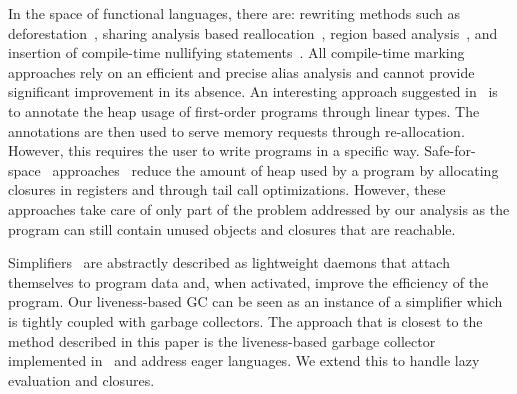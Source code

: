 \documentclass[9pt]{sigplanconf}
\begin{document}
In the  space of  functional languages,  there are:  rewriting methods
such                                                                as
deforestation~\cite{wadler88deforest,gill93ashort,chitil99deforest},
sharing  analysis   based  reallocation~\cite{jones89compile},  region
based  analysis~\cite{tofte98region},  and insertion  of  compile-time
nullifying     statements~\cite{inoue88analysis,lee05static,Hamilton}.
All compile-time marking  approaches rely on an  efficient and precise
alias  analysis  and cannot  provide  significant  improvement in  its
absence.  An interesting approach suggested in~\cite{HofmannJ03} is to
annotate the heap usage of  first-order programs through linear types.
The  annotations  are  then  used to  serve  memory  requests  through
re-allocation.  However, this requires the user to write programs in a
specific way. 
%
Safe-for-space~\cite{appel.cps}              approaches~\cite{Clinger,
  shao00efficient}  reduce the  amount of  heap used  by a  program by
allocating   closures    in   registers   and   through    tail   call
optimizations. However, these approaches take care of only part of the
problem addressed  by our  analysis as the  program can  still contain
unused objects and closures that are reachable.
%

Simplifiers~\cite{ONeill}  are  abstractly  described  as  lightweight
daemons that  attach themselves to  program data and,  when activated,
improve the  efficiency of the  program. Our liveness-based GC  can be
seen as  an instance  of a  simplifier which  is tightly  coupled with
garbage  collectors.   The approach  that  is  closest to  the  method
described  in  this  paper  is the  liveness-based  garbage  collector
implemented  in~\cite{karkare07liveness,asati14lgc} and  address eager
languages. We extend this to handle lazy evaluation and closures.
 



\end{document}
